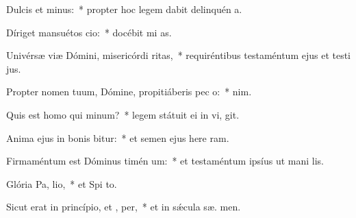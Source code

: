 \item Dulcis et  minus:~* propter hoc legem dabit delinquén  a.
\item Díriget mansuétos  cio:~* docébit mi  as.
\item Univérsæ viæ Dómini, misericórdi  ritas,~* requiréntibus testaméntum ejus et testi jus.
\item Propter nomen tuum, Dómine, propitiáberis pec o:~*   nim.
\item Quis est homo qui  minum?~* legem státuit ei in vi,  git.
\item Anima ejus in bonis bitur:~* et semen ejus here ram.
\item Firmaméntum est Dóminus timén um:~* et testaméntum ipsíus ut mani lis.
\item Glória Pa,  lio,~* et Spi to.
\item Sicut erat in princípio, et ,  per,~* et in sǽcula sæ. men.

